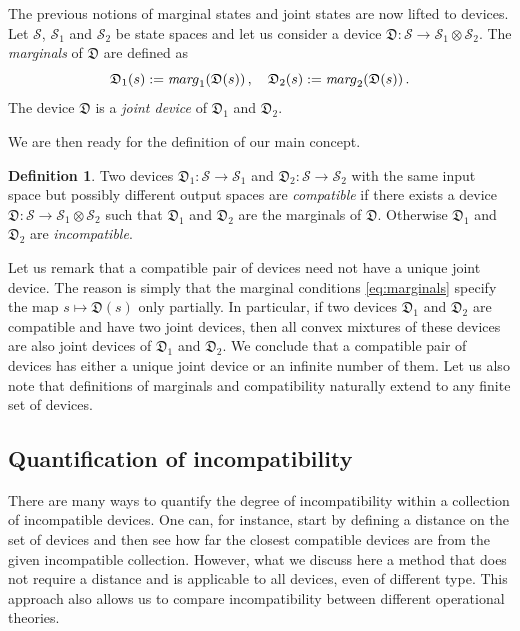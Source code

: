 \documentclass[12pt]{article}
\theoremstyle{definition}
\newtheorem*{definition*}{Definition}
\newcommand{\Dev}{\mathfrak{D}} %
\def\marg{{\textit mar\kern-1pt g}}
\begin{document}
The previous notions of marginal states and joint states are now lifted to devices. 
Let $\mathcal{S}$, $\mathcal{S}_1$ and $\mathcal{S}_2$ be state spaces and let us consider a device $\Dev:\mathcal{S}\to\mathcal{S}_1 \otimes \mathcal{S}_2$.
The \emph{marginals} of $\Dev$ are defined as
\begin{equation}\label{eq:marginals}
\Dev_1(s) := \marg_1(\Dev(s)) \, , \quad \Dev_2(s) := \marg_2(\Dev(s)) \, .
\end{equation}
The device $\Dev$ is a \emph{joint device} of $\Dev_1$ and $\Dev_2$.

We are then ready for the definition of our main concept.


\begin{definition*}
Two devices $\Dev_1: \mathcal{S} \to \mathcal{S}_1$ and 
$\Dev_2: \mathcal{S} \to \mathcal{S}_2$ with the same input space but possibly different output spaces are \emph{compatible} if there exists a device $\Dev: \mathcal{S} \to \mathcal{S}_1 \otimes \mathcal{S}_2$ such that $\Dev_1$ and $\Dev_2$ are the marginals of $\Dev$.
Otherwise $\Dev_1$ and $\Dev_2$ are \emph{incompatible}.
\end{definition*}

Let us remark that a compatible pair of devices need not have a unique joint device. The reason is simply that the marginal conditions \eqref{eq:marginals} specify the map $s \mapsto  \Dev(s)$ only partially. In particular, if two devices $\Dev_1$ and $\Dev_2$ are compatible and have two joint devices, then all convex mixtures of these  devices are also joint devices of $\Dev_1$ and $\Dev_2$. 
We conclude that a compatible pair of devices has either a unique joint device or an infinite number of them.  Let us also note that definitions of marginals and compatibility naturally extend to any finite set of devices. 

\subsection{Quantification of incompatibility}\label{sec:degree}

There are many ways to quantify the degree of incompatibility within a collection of incompatible devices. 
One can, for instance, start by defining a distance on the set of devices and then see how far the closest compatible devices are from the given incompatible collection.
However, what we discuss here a method that does not require a distance and is applicable to all devices, even of different type. 
This approach also allows us to compare incompatibility between different operational theories.
\end{document}
